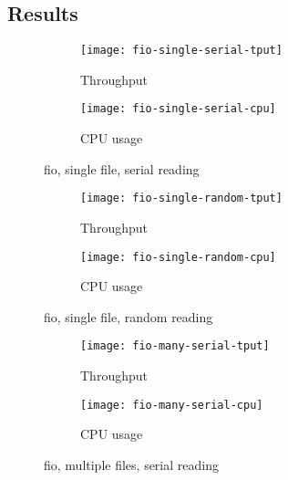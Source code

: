 \subsection{Results}

\begin{figure}
    \begin{minipage}[c][\textheight]{\textwidth}
        \begin{subfigure}[c][0.5\textheight]{\textwidth}
            \caption{Throughput}
            \texttt{[image: fio-single-serial-tput]}
            \label{fig:fio-single-serial-tput}
        \end{subfigure}
        \begin{subfigure}[c][0.5\textheight]{\textwidth}
            \caption{CPU usage}
            \texttt{[image: fio-single-serial-cpu]}
            \label{fig:fio-single-serial-cpu}
        \end{subfigure}
        \caption{fio, single file, serial reading}
        \label{fig:fio-single-serial}
    \end{minipage}
\end{figure}

\begin{figure}
    \begin{minipage}[c][\textheight]{\textwidth}
        \begin{subfigure}[c][0.5\textheight]{\textwidth}
            \caption{Throughput}
            \texttt{[image: fio-single-random-tput]}
            \label{fig:fio-single-random-tput}
        \end{subfigure}
        \begin{subfigure}[c][0.5\textheight]{\textwidth}
            \caption{CPU usage}
            \texttt{[image: fio-single-random-cpu]}
            \label{fig:fio-single-random-cpu}
        \end{subfigure}
        \caption{fio, single file, random reading}
        \label{fig:fio-single-random}
    \end{minipage}
\end{figure}

\begin{figure}
    \begin{minipage}[c][\textheight]{\textwidth}
        \begin{subfigure}[c][0.5\textheight]{\textwidth}
            \caption{Throughput}
            \texttt{[image: fio-many-serial-tput]}
            \label{fig:fio-many-serial-tput}
        \end{subfigure}
        \begin{subfigure}[c][0.5\textheight]{\textwidth}
            \caption{CPU usage}
            \texttt{[image: fio-many-serial-cpu]}
            \label{fig:fio-many-serial-cpu}
        \end{subfigure}
        \caption{fio, multiple files, serial reading}
        \label{fig:fio-many-serial}
    \end{minipage}
\end{figure}

